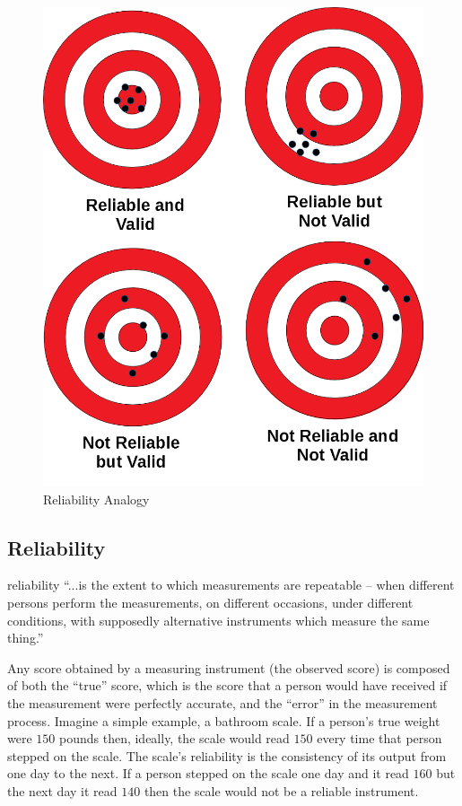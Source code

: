 \begin{figure}[H]
	\centering
	\includegraphics[width=\maxwidth{.95\linewidth}]{gfx/05-Targets}
	\caption{Reliability Analogy}
	\label{05:fig03}
\end{figure}

\subsection{Reliability}

\Gls{reliability} ``...is the extent to which measurements are repeatable – when different persons perform the measurements, on different occasions, under different conditions, with supposedly alternative instruments which measure the same thing.''\cite{drost2011validity}

Any score obtained by a measuring instrument (the observed score) is composed of both the ``true'' score, which is the score that a person would have received if the measurement were perfectly accurate, and the ``error'' in the measurement process. Imagine a simple example, a bathroom scale. If a person's true weight were $ 150 $ pounds then, ideally, the scale would read $ 150 $ every time that person stepped on the scale. The scale's reliability is the consistency of its output from one day to the next. If a person stepped on the scale one day and it read $ 160 $ but the next day it read $ 140 $ then the scale would not be a reliable instrument.

